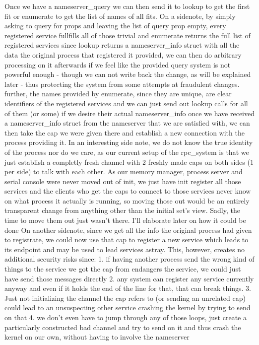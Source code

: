 Once we have a nameserver\_query we can then send it to lookup to get the first fit or enumerate to get the list of names of all fits.
On a sidenote, by simply asking to query for props and leaving the list of query prop empty, every registered service fullfills all of those trivial and enumerate returns the full list of registered services
since lookup returns a nameserver\_info struct with all the data the original process that registered it provided, we can then do arbitrary processing on it afterwards if we feel like the provided query system is not powerful enough - though we can not write back the change, as will be explained later - thus protecting the system from some attempts at fraudulent changes.
further, the names provided by enumerate, since they are unique, are clear identifiers of the registered services and we can just send out lookup calls for all of them (or some) if we desire their actual nameserver\_info
once we have received a nameserver\_info struct from the nameserver that we are satisfied with, we can then take the cap we were given there and establish a new connection with the process providing it. In an interesting side note, we do not know the true identity of the process nor do we care, as our current setup of the rpc\_system is that we just establish a completly fresh channel with 2 freshly made caps on both sides (1 per side) to talk with each other.
As our memory manager, process server and serial console were never moved out of init, we just have init register all those services and the clients who get the caps to connect to those services never know on what process it actually is running, so moving those out would be an entirely transparent change from anything other than the initial set's view. Sadly, the time to move them out just wasn't there. I'll elaborate later on how it could be done
On another sidenote, since we get all the info the original process had given to registrate, we could now use that cap to register a new service which leads to its endpoint and may be used to lead services astray. This, however, creates no additional security risks since:
1. if having another process send the wrong kind of things to the service we got the cap from endangers the service, we could just have send those messages directly
2. any system can register any service currently anyway and even if it holds the end of the line for that, that can break things.
3. Just not initializing the channel the cap refers to (or sending an unrelated cap) could lead to an unsuspecting other service crashing the kernel by trying to send on that
4. we don't even have to jump through any of those loops, just create a particularly constructed bad channel and try to send on it and thus crash the kernel on our own, without having to involve the nameserver

